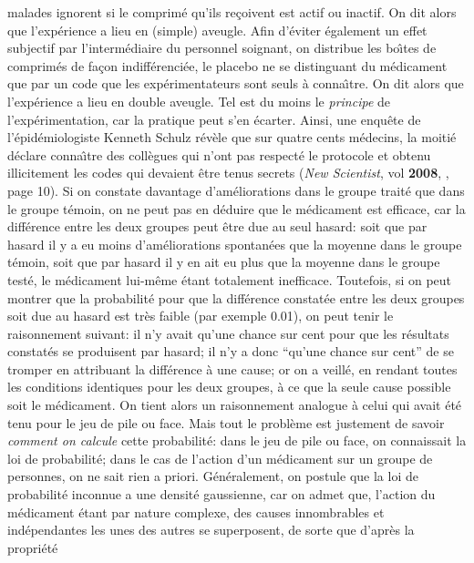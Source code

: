 malades ignorent si le comprim\'e qu'ils re\c{c}oivent est actif ou inactif. 
On dit alors que l'exp\'erience a lieu en (simple) aveugle. Afin d'\'eviter 
\'egalement un effet subjectif par l'interm\'ediaire du personnel soignant, 
on distribue les bo{\^\i}tes de comprim\'es de fa\c{c}on indiff\'erenci\'ee, 
le placebo ne se distinguant du m\'edicament que par un code que les 
exp\'erimentateurs sont seuls \`a conna{\^\i}tre. On dit alors que 
l'exp\'erience a lieu en double aveugle.  Tel est du moins le {\it principe} 
de l'exp\'erimentation, car la pratique peut s'en \'ecarter. Ainsi, une 
enqu\^ete de l'\'epid\'emiologiste Kenneth Schulz r\'ev\`ele que sur 
quatre cents m\'edecins, la moiti\'e d\'eclare conna{\^\i}tre des 
coll\`egues qui n'ont pas respect\'e le protocole et obtenu illicitement 
les codes qui devaient \^etre tenus secrets ({\sl New Scientist}, 
vol {\bf 2008}, {}, page 10).
\medskip
Si on constate davantage d'am\'eliorations dans le groupe trait\'e que dans
le groupe t\'emoin, on ne peut pas en d\'eduire que le m\'edicament est 
efficace, car la diff\'erence entre les deux groupes peut \^etre due au seul 
hasard: soit que par hasard il y a eu moins d'am\'eliorations spontan\'ees 
que la moyenne dans le groupe t\'emoin, soit que par hasard il y en ait eu 
plus que la moyenne dans le groupe test\'e, le m\'edicament lui-m\^eme 
\'etant totalement inefficace. Toutefois, si on peut montrer que la 
probabilit\'e pour que la diff\'erence constat\'ee entre les deux groupes 
soit due au hasard est tr\`es faible (par exemple 0.01), on peut tenir le 
raisonnement suivant: il n'y avait qu'une chance sur cent pour que les 
r\'esultats constat\'es se produisent par hasard; il n'y a donc ``qu'une 
chance sur cent'' de se tromper en attribuant la diff\'erence \`a une cause; 
or on a veill\'e, en rendant toutes les conditions identiques pour les deux 
groupes, \`a ce que la seule cause possible soit le m\'edicament. On tient 
alors un raisonnement analogue \`a celui qui avait \'et\'e tenu pour le jeu
de pile ou face. Mais tout le probl\`eme est justement de savoir {\it 
comment on calcule} cette probabilit\'e: dans le jeu de pile ou face, on 
connaissait la loi de probabilit\'e; dans le cas de l'action d'un 
m\'edicament sur un groupe de personnes, on ne sait rien a priori. 
G\'en\'eralement, on postule que la loi de probabilit\'e inconnue a une 
densit\'e gaussienne, car on admet que, l'action du m\'edicament \'etant 
par nature complexe, des causes innombrables et ind\'ependantes les
unes des autres se superposent, de sorte que d'apr\`es la propri\'et\'e 
